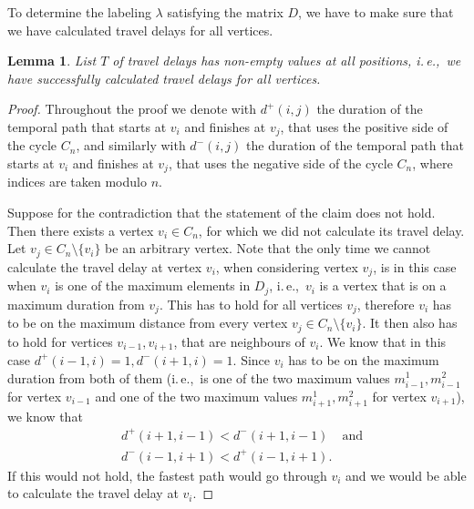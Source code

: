 \documentclass[11pt,a4paper]{article}
\newtheorem{lemma}[theorem]{Lemma}
\theoremstyle{remark}
\theoremstyle{definition}
\newcommand{\ie}{i.\,e.,\ }
\begin{document}
To determine the labeling $\lambda$ satisfying the matrix $D$, we have to make sure that we have calculated travel delays for all vertices.

\begin{lemma}
List $T$ of travel delays has non-empty values at all positions, \ie we have successfully calculated travel delays for all vertices.
\end{lemma}
\begin{proof}
    Throughout the proof we
    denote with $d^+(i,j)$ the duration of the temporal path that starts at $v_i$ and finishes at $v_j$, that uses the positive side of the cycle $C_n$,
    and similarly with $d^-(i,j)$ the duration of the temporal path that starts at $v_i$ and finishes at $v_j$, that uses the negative side of the cycle $C_n$,
    where indices are taken modulo $n$.
    
    Suppose for the contradiction that the statement of the claim does not hold. Then there exists a vertex $v_i \in C_n$, for which we did not calculate its travel delay.
    Let $v_j \in C_n \setminus \{v_i\}$ be an arbitrary vertex. 
    Note that the only time we cannot calculate the travel delay at vertex $v_i$, when considering vertex $v_j$, is in this case when $v_i$ is one of the maximum elements in $D_j$, \ie $v_i$ is a vertex that is on a maximum duration from $v_j$.
    This has to hold for all vertices $v_j$, therefore $v_i$ has to be on the maximum distance from every vertex $v_j \in C_n \setminus \{v_i\}$.
    It then also has to hold for vertices $v_{i-1}, v_{i+1}$, that are neighbours of $v_i$.
    We know that in this case $d^+(i-1,i) = 1, d^-(i+1,i) = 1$.
    Since $v_i$ has to be on the maximum duration from both of them 
    (\ie is one of the two maximum values $m^1_{i-1}, m^2_{i-1}$ for vertex $v_{i-1}$ and one of the two maximum values $m^1_{i+1}, m^2_{i+1}$ for vertex $v_{i+1}$),
    we know that 
    \begin{align}\label{eq:cycle-travel-delays-all}
        & d^+(i+1,i-1) < d^-(i+1,i-1) & \text{and}\\
        & d^-(i-1,i+1) < d^+(i-1,i+1).
    \end{align}
    If this would not hold, the fastest path would go through $v_i$ and we would be able to calculate the travel delay at $v_i$.
    

\end{proof}
\end{document}
